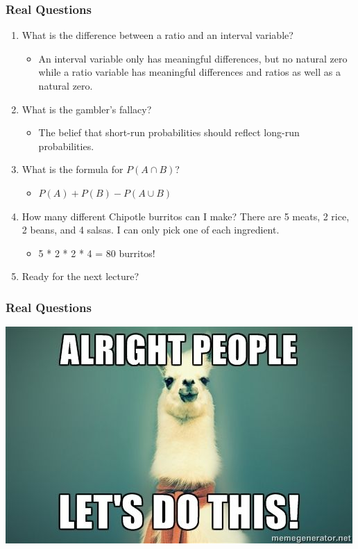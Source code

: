 \documentclass{beamer}
\begin{document}
\begin{frame}
\frametitle{Real Questions}
    \begin{enumerate}[<+- | alert@+>]
		\item What is the difference between a ratio and an interval variable?
			\begin{itemize}
				\item An interval variable only has meaningful differences, but no natural zero while a ratio variable has meaningful differences and ratios as well as a natural zero.
			\end{itemize}			        
        \item What is the gambler's fallacy?
            \begin{itemize}
                \item The belief that short-run probabilities should reflect long-run probabilities.
            \end{itemize}
        \item What is the formula for $P(A \cap B)$?
        	\begin{itemize}
        		\item $P(A) + P(B) - P(A \cup B)$
        	\end{itemize}
        \item How many different Chipotle burritos can I make? There are 5 meats, 2 rice, 2 beans, and 4 salsas. I can only pick one of each ingredient.
        	\begin{itemize}
        		\item 5 * 2 * 2 * 4 = 80 burritos! 
        	\end{itemize}
     \item Ready for the next lecture?	
    \end{enumerate}
\end{frame} 

\begin{frame}
\frametitle{Real Questions}
    \centering
	   \includegraphics[scale = 0.5]{letsDoThis3.jpg}
\end{frame} 
\end{document}
